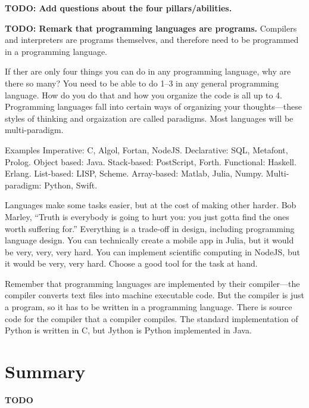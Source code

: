 \textbf{TODO: Add questions about the four pillars/abilities.}

\textbf{TODO: Remark that programming languages are programs.} Compilers and
interpreters are programs themselves, and therefore need to be programmed in a
programming language.

If ther are only four things you can do in any programming language, why are
there so many? You need to be able to do 1--3 in any general programming
language. How do you do that and how you organize the code is all up to 4.
Programming languages fall into certain ways of organizing your thoughts---these
styles of thinking and orgaization are called paradigms. Most languages will be
multi-paradigm.

Examples Imperative: C, Algol, Fortan, NodeJS. Declarative: SQL, Metafont,
Prolog. Object based: Java. Stack-based: PostScript, Forth. Functional: Haskell.
Erlang. List-based: LISP, Scheme. Array-based: Matlab, Julia, Numpy.
Multi-paradigm: Python, Swift.

Languages make some tasks easier, but at the cost of making other harder. Bob
Marley, ``Truth is everybody is going to hurt you: you just gotta find the ones
worth suffering for.'' Everything is a trade-off in design, including
programming language design. You can technically create a mobile app in Julia,
but it would be very, very, very hard. You can implement scientific computing in
NodeJS, but it would be very, very hard. Choose a good tool for the task at
hand.

Remember that programming languages are implemented by their compiler---the
compiler converts text files into machine executable code. But the compiler is
just a program, so it has to be written in a programming language. There is
source code for the compiler that a compiler compiles. The standard
implementation of Python is written in C, but Jython is Python implemented in
Java.

\section{Summary}
\textbf{TODO}
